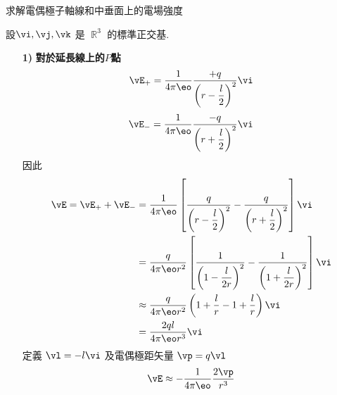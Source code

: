 
\begin{problem}
求解電偶極子軸線和中垂面上的電場強度

\end{problem}

\begin{solve}
    設$\vi,\vj,\vk$ 是 $\BbbR^3$ 的標準正交基.
    \begin{itemize}
        \item[\textbf{1)}]\textbf{對於延長線上的$P$點}
              $$\vE_+ = \frac{1}{4\pi\eo}\frac{+q}{\left(r - \dfrac{l}{2}\right)^2} \vi$$
              $$\vE_- = \frac{1}{4\pi\eo}\frac{-q}{\left(r + \dfrac{l}{2}\right)^2} \vi$$
              因此
              \begin{align*}
                  \vE = \vE_+ + \vE_-
                   & = \frac{1}{4\pi\eo}\left[\frac{q}{\left(r-\dfrac{l}{2}\right)^2}-\frac{q}{\left(r+\dfrac{l}{2}\right)^2}\right]\vi       \\
                   & = \frac{q}{4\pi\eo r^2}\left[\frac{1}{\left(1-\dfrac{l}{2r}\right)^2}-\frac{1}{\left(1+\dfrac{l}{2r}\right)^2}\right]\vi \\
                   & \approx \frac{q}{4\pi\eo r^2} \left(1+\frac{l}{r} - 1 + \frac{l}{r}\right) \vi                                           \\
                   & = \frac{2ql}{4\pi\eo r^3}\vi
              \end{align*}
              定義 $\vl = -l\vi$ 及電偶極距矢量 $\vp = q\vl$
              $$
                  \vE \approx -\frac{1}{4\pi\eo}\frac{2\vp}{r^3}
              $$


\end{itemize}
\end{solve}
